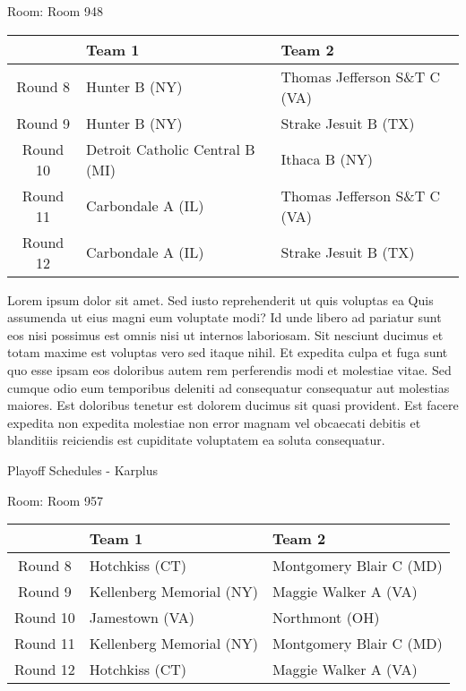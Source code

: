 \documentclass{article}%
\begin{document}
\vspace*{8pt}%
\linebreak%
\begin{flushleft}%
\begin{Large}%
Room: Room 948%
\end{Large}%
\end{flushleft}%
\begin{tabularx}{\textwidth}{|c|Y|Y|}%
\hline%
&Team 1&Team 2\\%
\hline%
Round 8&Hunter B (NY)&Thomas Jefferson S\&T C (VA)\\%
Round 9&Hunter B (NY)&Strake Jesuit B (TX)\\%
Round 10&Detroit Catholic Central B (MI)&Ithaca B (NY)\\%
Round 11&Carbondale A (IL)&Thomas Jefferson S\&T C (VA)\\%
Round 12&Carbondale A (IL)&Strake Jesuit B (TX)\\%
\hline%
\end{tabularx}%
\vspace*{8pt}%
\linebreak%
\newline%
Lorem ipsum dolor sit amet. Sed iusto reprehenderit ut quis voluptas ea Quis assumenda ut eius magni eum voluptate modi? Id unde libero ad pariatur sunt eos nisi possimus est omnis nisi ut internos laboriosam. Sit nesciunt ducimus et totam maxime est voluptas vero sed itaque nihil. Et expedita culpa et fuga sunt quo esse ipsam eos doloribus autem rem perferendis modi et molestiae vitae.\newline%
\newline%
Sed cumque odio eum temporibus deleniti ad consequatur consequatur aut molestias maiores. Est doloribus tenetur est dolorem ducimus sit quasi provident. Est facere expedita non expedita molestiae non error magnam vel obcaecati debitis et blanditiis reiciendis est cupiditate voluptatem ea soluta consequatur.%
\newpage%
\begin{center}%
\begin{Huge}%
Playoff Schedules {-} Karplus%
\end{Huge}%
\end{center}%
\begin{flushleft}%
\begin{Large}%
Room: Room 957%
\end{Large}%
\end{flushleft}%
\begin{tabularx}{\textwidth}{|c|Y|Y|}%
\hline%
&Team 1&Team 2\\%
\hline%
Round 8&Hotchkiss (CT)&Montgomery Blair C (MD)\\%
Round 9&Kellenberg Memorial (NY)&Maggie Walker A (VA)\\%
Round 10&Jamestown (VA)&Northmont (OH)\\%
Round 11&Kellenberg Memorial (NY)&Montgomery Blair C (MD)\\%
Round 12&Hotchkiss (CT)&Maggie Walker A (VA)\\%
\hline%
\end{tabularx}%
\end{document}
